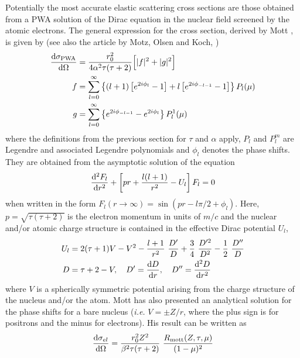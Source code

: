 Potentially the most accurate elastic scattering cross sections
are those obtained from a PWA solution of the Dirac equation
in the nuclear field screened by the atomic electrons.
The general expression for the cross section, derived by Mott \cite{Mo29},
is given by (see also the article by Motz, Olsen and Koch, \cite{Mo64})
\begin{equation}
\label{mott1}
\begin{split}
{{\rm d}\sigma_{\rm PWA} \over {\rm d}\Omega} & = {r_0^2 \over 4 \alpha^2 \tau
(\tau + 2) } \Big[ |f|^2 + |g|^2 \Big] \\
f & = \sum_{l=0}^\infty \left\{ (l+1) \left[ e^{2 i \phi_l} - 1 \right]
+ l \left[ e^{2 i \phi_{-l-1}} - 1 \right] \right\} P_l(\mu) \\
g & = \sum_{l=0}^\infty \left\{ e^{2 i \phi_{-l-1}} - e^{2 i \phi_l} \right\}
P_l^1(\mu)
\end{split}
\end{equation}
where the definitions from the previous section for $\tau$ and $\alpha$
apply, $P_l$ and $P_l^m$ are Legendre and associated Legendre polynomials
and $\phi_l$ denotes the phase shifts. They are obtained from
the asymptotic solution of the equation
\begin{equation}
\label{mott2}
{{\rm d}^2 F_l \over {\rm d}r^2} + \left[ p r + {l (l+1) \over r^2}
- U_l \right] F_l = 0
\end{equation}
when written in the form $F_l(r \to \infty) = \sin(p r - l \pi/2 + \phi_l)$.
Here, $p = \sqrt{\tau (\tau+2)}$ is the electron momentum in units
of $m/c$ and the nuclear and/or atomic charge structure
is contained in the effective Dirac potential $U_l$,
\begin{equation}
\label{mott3}
\begin{split}
U_l & = 2 (\tau + 1) V - V^2 - {l+1 \over r^2}~{D' \over D} +
\frac{3}{4}~{D^{\prime 2} \over D^2} - \frac{1}{2}~
\frac{D^{\prime \prime}}{D} \\
D & = \tau + 2 - V, \quad D' = {{\rm d} D \over {\rm d}r}, \quad
D^{\prime \prime} = {{\rm d}^2 D \over {\rm d}r^2}
\end{split}
\end{equation}
where $V$ is a spherically symmetric potential arising from the
charge structure of the nucleus and/or the atom.
Mott has also presented \cite{Mo32} an analytical solution for the
phase shifts for a bare nucleus ({\em i.e.} $V = \pm Z/r$, where
the plus sign is for positrons and the minus
for electrons). His result can be written as \cite{Mo64}
\begin{equation}
{{\rm d}\sigma_{el} \over {\rm d}\Omega} =
{r_0^2 Z^2 \over
\beta^2 \tau (\tau + 2) }~{R_{\rm mott}(Z,\tau,\mu) \over (1 - \mu )^2}
\end{equation}
